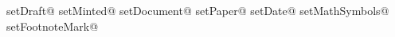   \def\setFootnoteMark@numbers{\footnotesymbolsfalse}
  \def\setFootnoteMark@symbols{\footnotesymbolstrue}

  \def\setMinted@yes{%
    \mintedtrue%
    \gdef\MintedOption{minted}%
    \PassOptionsToPackage{outputdir=/tmp/latexmk}{minted}
  }
  \def\setMinted@no{%
    \mintedfalse%
    \gdef\MintedOption{}%
  }

  \newcommand{\setup}[7]{%
    \csname setDraft@#1\endcsname%
    \csname setMinted@#2\endcsname%
    \csname setDocument@#3\endcsname%
    \csname setPaper@#4\endcsname%
    \csname setDate@#5\endcsname%
    \csname setMathSymbols@#6\endcsname%
    \csname setFootnoteMark@#7\endcsname%
  }
\makeatother

\setup{\optDraft}{\optMinted}{\optType}{\optPaper}{\optDate}{\optMathSymbols}{\optFootnoteMark}
